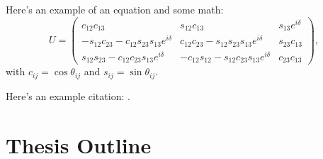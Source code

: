 Here's an example of an equation and some math:
\begin{equation}
  U = \begin{pmatrix} c_{12}c_{13} & s_{12}c_{13} & s_{13}e^{i\delta}\\
    -s_{12}c_{23} - c_{12}s_{23}s_{13}e^{i\delta} & c_{12}c_{23} - s_{12}s_{23}s_{13}e^{i\delta} & s_{23}c_{13}\\
    s_{12}s_{23} - c_{12}c_{23}s_{13}e^{i\delta} & -c_{12}s_{12} - s_{12}c_{23}s_{13}e^{i\delta} & c_{23}c_{13}
  \end{pmatrix},
\end{equation}
with $c_{ij} = \cos{\theta_{ij}}$ and $s_{ij} = \sin{\theta_{ij}}$.

Here's an example citation: \citep{PDG}.

\section{Thesis Outline}